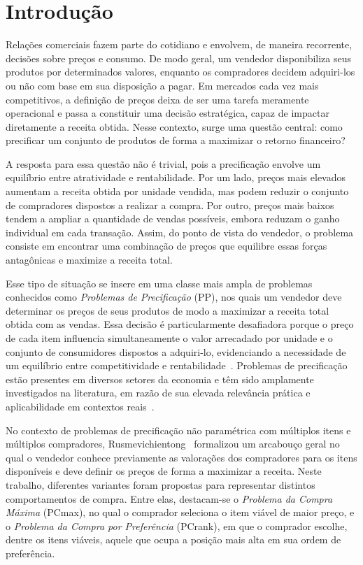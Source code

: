 \section{Introdução}

Relações comerciais fazem parte do cotidiano e envolvem, de maneira recorrente, decisões sobre preços e consumo. De modo geral, um vendedor disponibiliza seus produtos por determinados valores, enquanto os compradores decidem adquiri-los ou não com base em sua disposição a pagar. Em mercados cada vez mais competitivos, a definição de preços deixa de ser uma tarefa meramente operacional e passa a constituir uma decisão estratégica, capaz de impactar diretamente a receita obtida. Nesse contexto, surge uma questão central: como precificar um conjunto de produtos de forma a maximizar o retorno financeiro?

A resposta para essa questão não é trivial, pois a precificação envolve um equilíbrio entre atratividade e rentabilidade. Por um lado, preços mais elevados aumentam a receita obtida por unidade vendida, mas podem reduzir o conjunto de compradores dispostos a realizar a compra. Por outro, preços mais baixos tendem a ampliar a quantidade de vendas possíveis, embora reduzam o ganho individual em cada transação. Assim, do ponto de vista do vendedor, o problema consiste em encontrar uma combinação de preços que equilibre essas forças antagônicas e maximize a receita total.

Esse tipo de situação se insere em uma classe mais ampla de problemas conhecidos como \textit{Problemas de Precificação} (PP), nos quais um vendedor deve determinar os preços de seus produtos de modo a maximizar a receita total obtida com as vendas. Essa decisão é particularmente desafiadora porque o preço de cada item influencia simultaneamente o valor arrecadado por unidade e o conjunto de consumidores dispostos a adquiri-lo, evidenciando a necessidade de um equilíbrio entre competitividade e rentabilidade~\cite{smith1986}. Problemas de precificação estão presentes em diversos setores da economia e têm sido amplamente investigados na literatura, em razão de sua elevada relevância prática e aplicabilidade em contextos reais~\cite{aggarwal2004,venkatesan2005,shmuel1984,shmuel1987,smith1986}.

No contexto de problemas de precificação não paramétrica com múltiplos itens e múltiplos compradores, Rusmevichientong~\cite{rusmevichientong2006} formalizou um arcabouço geral no qual o vendedor conhece previamente as valorações dos compradores para os itens disponíveis e deve definir os preços de forma a maximizar a receita. Neste trabalho, diferentes variantes foram propostas para representar distintos comportamentos de compra. Entre elas, destacam-se o \textit{Problema da Compra Máxima} (PCmax), no qual o comprador seleciona o item viável de maior preço, e o \textit{Problema da Compra por Preferência} (PCrank), em que o comprador escolhe, dentre os itens viáveis, aquele que ocupa a posição mais alta em sua ordem de preferência.

